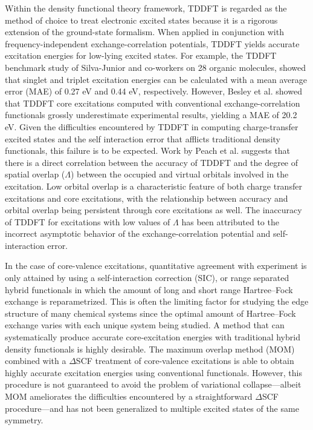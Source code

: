 \documentclass[11.5pt]{article}
\begin{document}
Within the density functional theory framework, TDDFT is regarded as the method of choice to treat electronic excited states because it is a rigorous extension of the ground-state formalism.\cite{runge_density-functional_1984} When applied in conjunction with frequency-independent exchange-correlation potentials, TDDFT yields accurate excitation energies for low-lying excited states. For example, the TDDFT benchmark study of Silva-Junior and co-workers\cite{silva-junior_benchmarks_2008} on 28 organic molecules, showed that singlet and triplet excitation energies can be calculated with a mean average error (MAE) of 0.27 eV and 0.44 eV, respectively. However, Besley et al.\cite{besley_self-consistent-field_2009} showed that TDDFT core excitations computed with conventional exchange-correlation functionals grossly underestimate experimental results, yielding a MAE of 20.2 eV.  Given the difficulties encountered by TDDFT in computing charge-transfer excited states\cite{dreuw_failure_2004} and the self interaction error that afflicts traditional density functionals, this failure is to be expected.
Work by Peach et al. \cite{peach_excitation_2008} suggests that there is a direct correlation between the accuracy of TDDFT and the degree of spatial overlap ($\Lambda$) between the occupied and virtual orbitals involved in the excitation. Low orbital overlap is a characteristic feature of both charge transfer excitations and core excitations, with the relationship between accuracy and orbital overlap being persistent through core excitations as well. \cite{besley_time-dependent_2009}
The inaccuracy of TDDFT for excitations with low values of $\Lambda$ has been attributed to the incorrect asymptotic behavior of the exchange-correlation potential and self-interaction error.

In the case of core-valence excitations, quantitative agreement with experiment is only attained by using a self-interaction correction (SIC),\cite{tu_core_2007} or range separated hybrid functionals in which the amount of long and short range Hartree--Fock exchange is reparametrized.\cite{besley_time-dependent_2009, nakata_time-dependent_2006} This is often the limiting factor for studying the edge structure of many chemical systems since the optimal amount of Hartree--Fock exchange varies with each unique system being studied.\cite{capano_role_2013,besley_time-dependent_2007,besley_time-dependent_2010} A method that can systematically produce accurate core-excitation energies with traditional hybrid density functionals is highly desirable. The maximum overlap method (MOM) \cite{besley_self-consistent-field_2009} combined with a $\Delta$SCF treatment of core-valence excitations is able to obtain highly accurate excitation energies using conventional functionals. However, this procedure is not guaranteed to avoid the problem of variational collapse---albeit MOM ameliorates the difficulties encountered by a straightforward $\Delta$SCF procedure---and has not been generalized to multiple excited states of the same symmetry.
\end{document}
